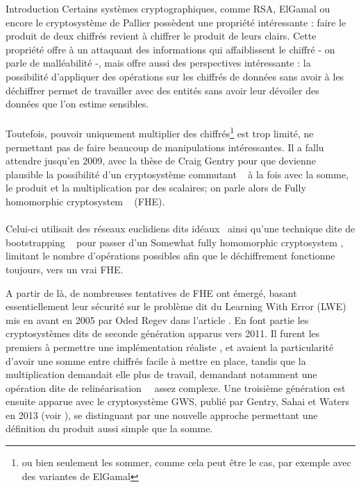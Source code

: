 \begin{section}{Introduction}
Certains systèmes cryptographiques, comme RSA, ElGamal ou encore le cryptosystème de Pallier possèdent une
propriété intéressante : faire le produit de deux chiffrés revient à chiffrer le produit de leurs clairs. Cette
propriété offre à un attaquant des informations qui affaiblissent le chiffré - on parle de malléabilité -, mais
offre aussi des perspectives intéressante : la possibilité d'appliquer des opérations sur les chiffrés de
données sans avoir à les déchiffrer permet de travailler avec des entités sans avoir leur dévoiler des données que l'on estime sensibles.
	\paragraph{}
	Toutefois, pouvoir uniquement multiplier des chiffrés\footnote{ou bien seulement les sommer, comme cela peut
	être le cas, par exemple avec des variantes de ElGamal} est trop limité, ne permettant pas de faire beaucoup de manipulations intéressantes. Il a fallu attendre jusqu'en 2009, avec la thèse de Craig Gentry \cite{gentry_thesis} pour que devienne plausible la possibilité d'un cryptosystème \og commutant \fg~ à la fois avec la somme, le produit et la multiplication par des scalaires; on parle alors de \og Fully homomorphic cryptosystem \fg~ (FHE).

	\paragraph{}
	Celui-ci utilisait des réseaux euclidiens dits \og idéaux\fg~ ainsi qu'une technique dite de \og bootstrapping \fg~ pour passer d'un \og Somewhat fully homomorphic cryptosystem \fg, limitant le nombre d'opérations possibles afin que le déchiffrement fonctionne toujours, vers un vrai FHE.

A partir de là, de nombreuses tentatives de FHE ont émergé, basant essentiellement leur sécurité sur le problème
dit du Learning With Error (LWE) mis en avant en 2005 par Oded Regev dans l'article \cite{STOC:Regev05}.
En font partie les cryptosystèmes dits de seconde génération apparus vers 2011. 
Il furent les premiers à permettre une implémentation \og réaliste \fg, et avaient la particularité d'avoir une somme entre chiffrés facile à
mettre en place, tandis que la multiplication demandait elle plus de travail, demandant notamment une opération
dite de \og relinéarisation \fg~ assez complexe.  Une troisième génération est ensuite apparue avec le cryptosystème
GWS, publié  par Gentry, Sahai et Waters en 2013 (voir \cite{EPRINT:GenSahWat13}), se distinguant par 
une nouvelle approche permettant une définition du produit aussi simple que la somme.


\end{section}
